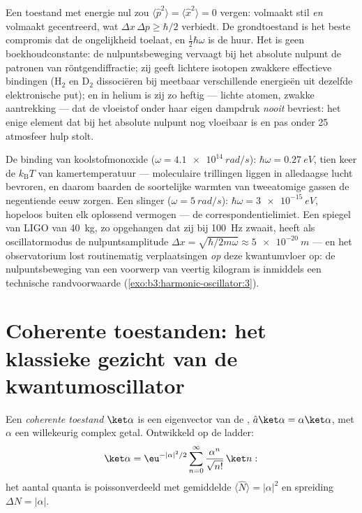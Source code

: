 \begin{remark}\label{rem:b3:harmonic-oscillator:zeropoint}
Een toestand met energie nul zou $\langle\hat p^2\rangle =
\langle\hat x^2\rangle = 0$ vergen: volmaakt stil \emph{en} volmaakt gecentreerd, wat
$\Delta x\,\Delta p \ge \hbar/2$ verbiedt. De grondtoestand is het beste
compromis dat de ongelijkheid toelaat, en $\tfrac12\hbar\omega$ is de
huur. Het is geen boekhoudconstante: de nulpuntsbeweging vervaagt bij het
absolute nulpunt de patronen van röntgendiffractie; zij geeft lichtere
isotopen zwakkere effectieve bindingen (H$_2$ en D$_2$ dissociëren bij
meetbaar verschillende energieën uit dezelfde elektronische put); en in
helium is zij zo heftig --- lichte atomen, zwakke aantrekking --- dat de
vloeistof onder haar eigen dampdruk \emph{nooit} bevriest: het enige
element dat bij het absolute nulpunt nog vloeibaar is en pas onder 25
atmosfeer hulp stolt.
\end{remark}

\begin{example}\label{ex:b3:harmonic-oscillator:scales}
De binding van koolstofmonoxide ($\omega = \qty{4.1e14}{rad/s}$):
$\hbar\omega =
\qty{0.27}{eV}$, tien keer de $k_{\text{B}}T$ van
kamertemperatuur --- moleculaire trillingen liggen in alledaagse lucht
bevroren, en daarom baarden de soortelijke warmten van tweeatomige gassen
de negentiende eeuw zorgen. Een slinger ($\omega = \qty{5}{rad/s}$):
$\hbar\omega = \qty{3e-15}{eV}$, hopeloos buiten elk oplossend vermogen
--- de correspondentielimiet. Een spiegel van LIGO van \qty{40}{kg},
zo opgehangen dat zij bij \qty{100}{Hz} zwaait, heeft als oscillatormodus de nulpuntsamplitude $\Delta x =
\sqrt{\hbar/2m\omega} \approx \qty{5e-20}{m}$ --- en het observatorium
lost routinematig verplaatsingen \emph{op} deze kwantumvloer op: de
nulpuntsbeweging van een voorwerp van veertig kilogram is inmiddels een
technische randvoorwaarde (\cref{exo:b3:harmonic-oscillator:3}).
\end{example}

\section{Coherente toestanden: het klassieke gezicht van de kwantumoscillator}

\begin{definition}\label{def:b3:harmonic-oscillator:coherent}
Een \emph{coherente toestand} $\ket\alpha$ is een eigenvector van de
, $\hat a\ket\alpha = \alpha\ket\alpha$, met $\alpha$
een willekeurig complex getal. Ontwikkeld op de ladder:
\[
\ket\alpha = \eu^{-|\alpha|^2/2}\sum_{n=0}^\infty
\frac{\alpha^n}{\sqrt{n!}}\,\ket n :
\]
het aantal quanta is poissonverdeeld met gemiddelde $\langle\hat
N\rangle = |\alpha|^2$ en spreiding $\Delta N = |\alpha|$.
\end{definition}

